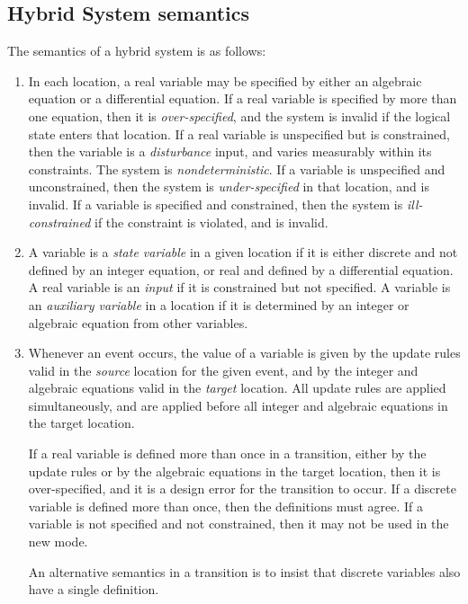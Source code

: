 \documentclass[a4paper,11pt]{article}
\begin{document}
\subsection*{Hybrid System semantics}

The semantics of a hybrid system is as follows:
\begin{enumerate}[(S1)]
 \item In each location, a real variable may be specified by either an algebraic equation or a differential equation. If a real variable is specified by more than one equation, then it is \emph{over-specified}, and the system is invalid if the logical state enters that location. If a real variable is unspecified but is constrained, then the variable is a \emph{disturbance} input, and varies measurably within its constraints. The system is \emph{nondeterministic}. If a variable is unspecified and unconstrained, then the system is \emph{under-specified} in that location, and is invalid. If a variable is specified and constrained, then the system is \emph{ill-constrained} if the constraint is violated, and is invalid.
 
 \item A variable is a \emph{state variable} in a given location if it is either discrete and not defined by an integer equation, or real and defined by a differential equation. A real variable is an \emph{input} if it is constrained but not specified. A variable is an \emph{auxiliary variable} in a location if it is determined by an integer or algebraic equation from other variables.

 \item Whenever an event occurs, the value of a variable is given by the update rules valid in the \emph{source} location for the given event, and by the integer and algebraic equations valid in the \emph{target} location. All update rules are applied simultaneously, and are applied before all integer and algebraic equations in the target location. 

 If a real variable is defined more than once in a transition, either by the update rules or by the algebraic equations in the target location, then it is over-specified, and it is a design error for the transition to occur. If a discrete variable is defined more than once, then the definitions must agree. If a variable is not specified and not constrained, then it may not be used in the new mode.

 An alternative semantics in a transition is to insist that discrete variables also have a single definition.


\end{enumerate}
\end{document}
